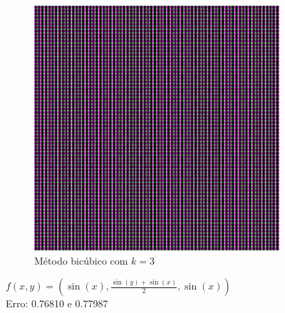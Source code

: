 \documentclass[leqno]{article}
\begin{document}
\begin{figure}[H]
\begin{subfigure}{.33\textwidth}
        \includegraphics[width=.7\linewidth]{../images/func_1_color_bic.png}
        \caption{Método bicúbico com $k = 3$}
        \label{fig:sub1}
      \end{subfigure}%
    \caption{$f(x,y) = (\sin(x), \frac{\sin(y) + \sin(x)}{2}, \sin(x))$ \\ Erro: 0.76810 e 0.77987}
    \label{fig:test}
\end{figure}
\end{document}
